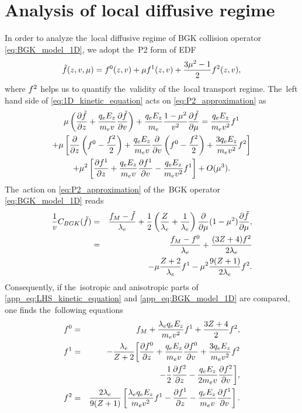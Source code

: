 \section{Analysis of local diffusive regime}
\label{app:DiffusiveKinetics}

In order to analyze the~local diffusive regime of BGK collision operator 
\eqref{eq:BGK_model_1D}, we adopt the~P2 form of EDF
\begin{equation}
  \tilde{f}(z, v, \mu) = f^0(z, v) + \mu f^1(z, v)
  + \frac{3 \mu^2 - 1}{2} f^2(z, v),
  \label{eq:P2_approximation}
\end{equation} 
where $f^2$ helps us to quantify the~validity of the~local transport regime.
The~left hand side of \eqref{eq:1D_kinetic_equation} acts on 
\eqref{eq:P2_approximation} as
\begin{multline}
  \mu\left(\frac{\partial{\tilde{f}}}{\partial{z}} 
  + \frac{q_eE_z}{m_ev}\frac{\partial{\tilde{f}}}{\partial{v}}\right) 
  + \frac{q_eE_z}{m_e}\frac{1-\mu^2}{v^2}\frac{\partial{\tilde{f}}}{\partial{\mu}} = 
  \frac{q_eE_z}{m_ev^2} f^1
  \\
  + \mu\left[\frac{\partial{}}{\partial{z}}\left(f^0 - \frac{f^2}{2} \right) 
  + \frac{q_eE_z}{m_ev}\frac{\partial{}}{\partial{v}}\left(f^0 - \frac{f^2}{2} \right) 
  + \frac{3q_eE_z}{m_ev^2} f^2 \right] 
  \\
  + \mu^2\left[\frac{\partial{f^1}}{\partial{z}} 
  + \frac{q_eE_z}{m_ev}\frac{\partial{f^1}}{\partial{v}} - \frac{q_eE_z}{m_ev^2} f^1
  \right] 
  + O(\mu^3) .
  \label{app_eq:LHS_kinetic_equation}
\end{multline}
The~action on \eqref{eq:P2_approximation} of the~BGK operator 
\eqref{eq:BGK_model_1D} reads
\begin{eqnarray}
  \frac{1}{v}C_{BGK}(\tilde{f})
  &=&
  \frac{f_M - \tilde{f}}{\lambda_e}
  + \frac{1}{2}\left(\frac{Z}{\lambda_e} + \frac{1}{\lambda_e}\right)
  \frac{\partial{}}{\partial{\mu}}(1 - \mu^2)\frac{\partial{\tilde{f}}}{\partial{\mu}} ,\nonumber\\
  &=&  \frac{f_M - f^0}{\lambda_e} + \frac{(3Z + 4)f^2}{2 \lambda_e}
  \nonumber\\
  &&- \mu \frac{Z + 2}{\lambda_e}f^1  
  - \mu^2\frac{9(Z + 1)}{2\lambda_e}f^2.
  \label{app_eq:BGK_model_1D}
\end{eqnarray}
Consequently, if the~isotropic and anisotropic parts of 
\eqref{app_eq:LHS_kinetic_equation} and \eqref{app_eq:BGK_model_1D} are 
compared, one finds the~following equations 
\begin{eqnarray}
  f^0 &=& f_M + \frac{\lambda_eq_eE_z}{m_ev^2}f^1 
  + \frac{3Z + 4}{2}f^2,
  \label{app_eq:BGK_f0} \\
  f^1 &=& - \frac{\lambda_e}{Z + 2}
  \bigg[ \frac{\partial{f^0}}{\partial{z}} + \frac{q_eE_z}{m_ev}\frac{\partial{f^0}}{\partial{v}}
  + \frac{3q_eE_z}{m_ev^2} f^2 
  \nonumber\\
  && - \frac{1}{2}\frac{\partial{f^2}}{\partial{z}} - \frac{q_eE_z}{2m_ev}\frac{\partial{f^2}}{\partial{v}}
  \bigg] , 
  \label{app_eq:BGK_f1}
  \\
  f^2 &=& \frac{2 \lambda_e}{9(Z + 1)}
  \left[ 
  \frac{\lambda_eq_eE_z}{m_ev^2}f^1 -  
  \frac{\partial{f^1}}{\partial{z}} - \frac{q_eE_z}{m_ev}\frac{\partial{f^1}}{\partial{v}}
  \right] .
  \label{app_eq:BGK_f2}
\end{eqnarray}
